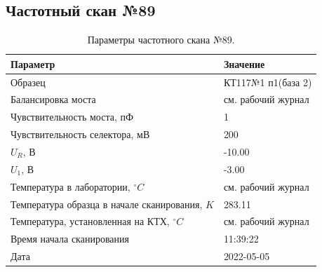 \subsection{Частотный скан №89}
\begin{table}[!ht]
    \centering
    \caption{Параметры частотного скана №89.}
    \begin{tabular}{|l|l|}
        \hline
        Параметр                                       & Значение                  \\ \hline
        Образец                                        & КТ117№1 п1(база 2)        \\ \hline
        Балансировка моста                             & см. рабочий журнал        \\ \hline
        Чувствительность моста, пФ                     & 1                         \\ \hline
        Чувствительность селектора, мВ                 & 200                       \\ \hline
        $U_R$, В                                       & -10.00                    \\ \hline
        $U_1$, В                                       & -3.00                     \\ \hline
        Температура в лаборатории, $^\circ C$          & см. рабочий журнал        \\ \hline
        Температура образца в начале сканирования, $K$ & 283.11                    \\ \hline
        Температура, установленная на КТХ, $^\circ C$  & см. рабочий журнал        \\ \hline
        Время начала сканирования                      & 11:39:22                  \\ \hline
        Дата                                           & 2022-05-05                \\ \hline
    \end{tabular}
    \label{table:frequency_scan_89}
\end{table}


